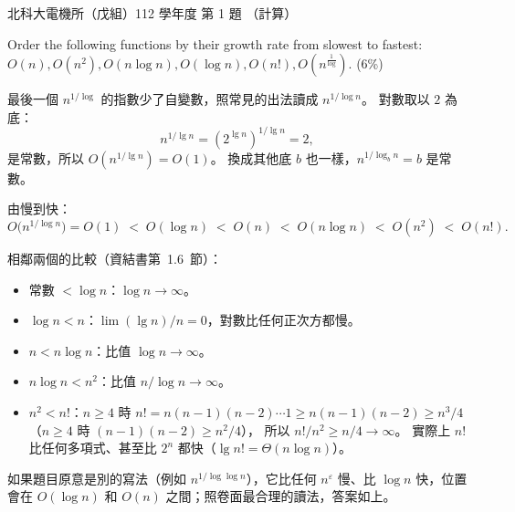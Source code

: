 \begin{pastexam}[label={px:ntut-112-ee-ds-01}]{北科大電機所（戊組）112 學年度 第 1 題}
（計算）

Order the following functions by their growth rate from slowest to fastest:\\
$O(n), O(n^2), O(n\log n), O(\log n), O(n!), O\left(n^{\frac{1}{\log}}\right)$. (6\%)
\end{pastexam}

\begin{pastsoln}
最後一個 $n^{1/\log}$ 的指數少了自變數，照常見的出法讀成 $n^{1/\log n}$。 對數取以 $2$ 為底：
\[
n^{1/\lg n} = \left(2^{\lg n}\right)^{1/\lg n} = 2 ,
\]
是常數，所以 $O(n^{1/\lg n}) = O(1)$。 換成其他底 $b$ 也一樣，$n^{1/\log_b n} = b$ 是常數。

由慢到快：
\[
O\bigl(n^{1/\log n}\bigr) = O(1) \;<\; O(\log n) \;<\; O(n) \;<\; O(n\log n) \;<\; O(n^2) \;<\; O(n!) .
\]

相鄰兩個的比較（資結書第~1.6~節）：
\begin{itemize}
\item 常數 $< \log n$：$\log n \to \infty$。
\item $\log n < n$：$\lim (\lg n)/n = 0$，對數比任何正次方都慢。
\item $n < n\log n$：比值 $\log n \to \infty$。
\item $n\log n < n^2$：比值 $n / \log n \to \infty$。
\item $n^2 < n!$：$n \ge 4$ 時 $n! = n(n-1)(n-2)\cdots 1 \ge n(n-1)(n-2) \ge n^3/4$（$n \ge 4$ 時 $(n-1)(n-2) \ge n^2/4$），
所以 $n!/n^2 \ge n/4 \to \infty$。 實際上 $n!$ 比任何多項式、甚至比 $2^n$ 都快（$\lg n! = \Theta(n\log n)$）。
\end{itemize}
如果題目原意是別的寫法（例如 $n^{1/\log\log n}$），它比任何 $n^\varepsilon$ 慢、比 $\log n$ 快，位置會在
$O(\log n)$ 和 $O(n)$ 之間；照卷面最合理的讀法，答案如上。
\end{pastsoln}
